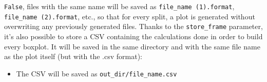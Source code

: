 \texttt{False}, files with the same name will be saved as \texttt{file\_name (1).format}, \texttt{file\_name (2).format},
etc., so that for every split, a plot is generated without overwriting any previously generated files.
Thanks to the \texttt{store\_frame} parameter, it's also possible to store a CSV containing the calculations done in
order to build every boxplot.
It will be saved in the same directory and with the same file name as the plot itself
(but with the .csv format):
\begin{itemize}
    \item The CSV will be saved as \texttt{out\_dir/file\_name.csv}
\end{itemize}
\hfill\break
\hfill\break

